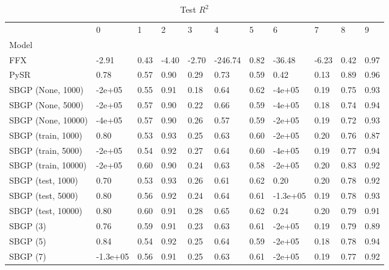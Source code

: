 \begin{table}
\caption{Test $R^2$}
\label{tab:Rsq_test}
\begin{tabular}{lllllllllll}
\toprule
 & 0 & 1 & 2 & 3 & 4 & 5 & 6 & 7 & 8 & 9 \\
Model &  &  &  &  &  &  &  &  &  &  \\
\midrule
FFX & -2.91 & 0.43 & -4.40 & -2.70 & -246.74 & 0.82 & -36.48 & -6.23 & 0.42 & 0.97 \\
PySR & 0.78 & 0.57 & 0.90 & 0.29 & 0.73 & 0.59 & 0.42 & 0.13 & 0.89 & 0.96 \\
SBGP (None, 1000) & -2e+05 & 0.55 & 0.91 & 0.18 & 0.64 & 0.62 & -4e+05 & 0.19 & 0.75 & 0.93 \\
SBGP (None, 5000) & -2e+05 & 0.57 & 0.90 & 0.22 & 0.66 & 0.59 & -4e+05 & 0.18 & 0.74 & 0.94 \\
SBGP (None, 10000) & -4e+05 & 0.57 & 0.90 & 0.26 & 0.57 & 0.59 & -2e+05 & 0.19 & 0.72 & 0.93 \\
SBGP (train, 1000) & 0.80 & 0.53 & 0.93 & 0.25 & 0.63 & 0.60 & -2e+05 & 0.20 & 0.76 & 0.87 \\
SBGP (train, 5000) & -2e+05 & 0.54 & 0.92 & 0.27 & 0.64 & 0.60 & -4e+05 & 0.19 & 0.77 & 0.94 \\
SBGP (train, 10000) & -2e+05 & 0.60 & 0.90 & 0.24 & 0.63 & 0.58 & -2e+05 & 0.20 & 0.83 & 0.92 \\
SBGP (test, 1000) & 0.70 & 0.53 & 0.93 & 0.26 & 0.61 & 0.62 & 0.20 & 0.20 & 0.78 & 0.92 \\
SBGP (test, 5000) & 0.80 & 0.56 & 0.92 & 0.24 & 0.64 & 0.61 & -1.3e+05 & 0.19 & 0.78 & 0.93 \\
SBGP (test, 10000) & 0.80 & 0.60 & 0.91 & 0.28 & 0.65 & 0.62 & 0.24 & 0.20 & 0.79 & 0.91 \\
SBGP (3) & 0.76 & 0.59 & 0.91 & 0.23 & 0.63 & 0.61 & -2e+05 & 0.19 & 0.79 & 0.89 \\
SBGP (5) & 0.84 & 0.54 & 0.92 & 0.25 & 0.64 & 0.59 & -2e+05 & 0.18 & 0.78 & 0.94 \\
SBGP (7) & -1.3e+05 & 0.56 & 0.91 & 0.25 & 0.63 & 0.61 & -2e+05 & 0.19 & 0.77 & 0.92 \\
\bottomrule
\end{tabular}
\end{table}
